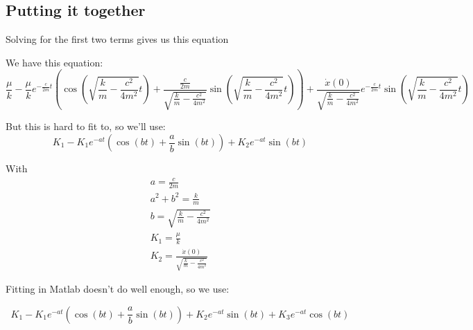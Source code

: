 \documentclass{article}
\begin{document}
\subsection{Putting it together}

Solving for the first two terms gives us this equation

We have this equation:
\begin{equation*}
    \frac{\mu}{k} - \frac{\mu}{k}e^{-\frac{c}{2m}t}(\cos(\sqrt{\frac{k}{m} - \frac{c^2}{4m^2}}t) + \frac{\frac{c}{2m}}{\sqrt{\frac{k}{m} - \frac{c^2}{4m^2}}}\sin(\sqrt{\frac{k}{m} - \frac{c^2}{4m^2}}t)) + \frac{\dot{x}(0)}{\sqrt{\frac{k}{m} - \frac{c^2}{4m^2}}} e^{-\frac{c}{2m}t}\sin(\sqrt{\frac{k}{m} - \frac{c^2}{4m^2}}t)
\end{equation*}

But this is hard to fit to, so we'll use:
\begin{equation*}
    K_1 - K_1e^{-at}(\cos(bt) + \frac{a}{b}\sin(bt)) + K_2e^{-at}\sin(bt)
\end{equation*}

With
\begin{gather*}
    a = \frac{c}{2m} \\
    a^2 + b^2 = \frac{k}{m} \\
    b = \sqrt{\frac{k}{m} - \frac{c^2}{4m^2}} \\
    K_1 = \frac{\mu}{k} \\
    K_2 = \frac{\dot{x}(0)}{\sqrt{\frac{k}{m} - \frac{c^2}{4m^2}}}
\end{gather*}

Fitting in Matlab doesn't do well enough, so we use:

\begin{equation*}
    K_1 - K_1e^{-at}(\cos(bt) + \frac{a}{b}\sin(bt)) + K_2e^{-at}\sin(bt) + K_3 e^{-at}\cos(bt)
\end{equation*}
\end{document}
